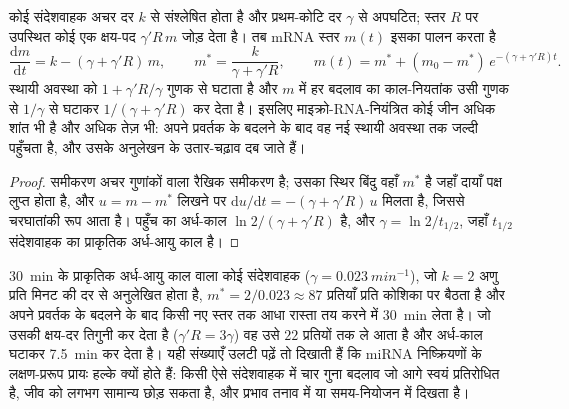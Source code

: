 \begin{theorem}\label{thm:b3:rna-regulation:mirna-kinetics}
कोई संदेशवाहक अचर दर $k$ से संश्लेषित होता है और प्रथम-कोटि दर
$\gamma$ से अपघटित; स्तर $R$ पर उपस्थित कोई  एक क्षय-पद
$\gamma' R\, m$ जोड़ देता है। तब mRNA स्तर $m(t)$ इसका पालन करता है
\[
\frac{\mathrm{d}m}{\mathrm{d}t} = k - (\gamma + \gamma' R)\, m,
\qquad
m^{*} = \frac{k}{\gamma + \gamma' R},
\qquad
m(t) = m^{*} + (m_{0} - m^{*})\,e^{-(\gamma + \gamma' R)t}.
\]
 स्थायी अवस्था को $1 + \gamma' R/
\gamma$ गुणक से घटाता है और $m$ में हर बदलाव का काल-नियतांक उसी गुणक
से $1/\gamma$ से घटाकर $1/(\gamma + \gamma' R)$ कर देता है। इसलिए
माइक्रो-RNA-नियंत्रित कोई जीन अधिक शांत भी है और अधिक तेज़ भी: अपने
प्रवर्तक के बदलने के बाद वह नई स्थायी अवस्था तक जल्दी पहुँचता है, और
उसके अनुलेखन के उतार-चढ़ाव दब जाते हैं।
\end{theorem}
\begin{proof}
समीकरण अचर गुणांकों वाला रैखिक समीकरण है; उसका स्थिर बिंदु वहाँ
$m^{*}$ है जहाँ दायाँ पक्ष लुप्त होता है, और $u = m - m^{*}$ लिखने पर
$\mathrm{d}u/\mathrm{d}t = -(\gamma + \gamma' R)\,u$ मिलता है, जिससे
चरघातांकी रूप आता है। पहुँच का अर्ध-काल $\ln 2/(\gamma + \gamma'
R)$ है, और $\gamma = \ln 2 / t_{1/2}$, जहाँ $t_{1/2}$ संदेशवाहक का
प्राकृतिक अर्ध-आयु काल है।
\end{proof}

\begin{example}[चार गुना दमन]\label{ex:b3:rna-regulation:fourfold}
\qty{30}{min} के प्राकृतिक अर्ध-आयु काल वाला कोई संदेशवाहक ($\gamma =
\qty{0.023}{min^{-1}}$), जो $k = 2$ अणु प्रति मिनट की दर से अनुलेखित
होता है, $m^{*} = 2/0.023 \approx 87$ प्रतियाँ प्रति कोशिका पर बैठता है
और अपने प्रवर्तक के बदलने के बाद किसी नए स्तर तक आधा रास्ता तय करने में
\qty{30}{min} लेता है। जो  उसकी क्षय-दर तिगुनी कर देता है
($\gamma' R = 3\gamma$) वह उसे $22$ प्रतियों तक ले आता है और अर्ध-काल
घटाकर \qty{7.5}{min} कर देता है। यही संख्याएँ उलटी पढ़ें तो दिखाती हैं
कि miRNA निष्क्रियणों के लक्षण-प्ररूप प्रायः हल्के क्यों होते हैं: किसी
ऐसे संदेशवाहक में चार गुना बदलाव जो आगे स्वयं प्रतिरोधित है, जीव को
लगभग सामान्य छोड़ सकता है, और प्रभाव तनाव में या समय-नियोजन में दिखता
है।
\end{example}

